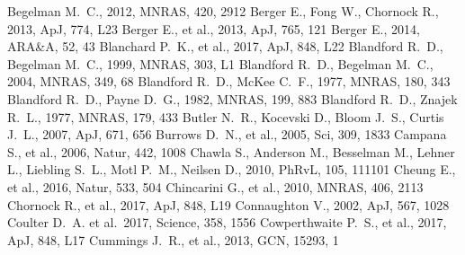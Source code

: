 \documentclass[a4paper,fleqn,usenatbib]{mnras}
\begin{document}
\begin{thebibliography}{207}
 Begelman M.~C., 2012, MNRAS, 420, 2912
 Berger E., Fong W., Chornock R., 2013, ApJ, 774, L23
 Berger E., et al., 2013, ApJ, 765, 121
 Berger E., 2014, ARA\&A, 52, 43
 Blanchard P.~K., et al., 2017, ApJ, 848, L22
 Blandford R.~D., Begelman M.~C., 1999, MNRAS, 303, L1
 Blandford R.~D., Begelman M.~C., 2004, MNRAS, 349, 68
 Blandford R.~D., McKee C.~F., 1977, MNRAS, 180, 343
 Blandford R.~D., Payne D.~G., 1982, MNRAS, 199, 883
 Blandford R.~D., Znajek R.~L., 1977, MNRAS, 179, 433
 Butler N.~R., Kocevski D., Bloom J.~S., Curtis J.~L., 2007, ApJ, 671, 656
 Burrows D.~N., et al., 2005, Sci, 309, 1833
 Campana S., et al., 2006, Natur, 442, 1008
 Chawla S., Anderson M., Besselman M., Lehner L., Liebling S.~L., Motl P.~M., Neilsen D., 2010, PhRvL, 105, 111101
 Cheung E., et al., 2016, Natur, 533, 504
 Chincarini G., et al., 2010, MNRAS, 406, 2113
 Chornock R., et al., 2017, ApJ, 848, L19
 Connaughton V., 2002, ApJ, 567, 1028
 Coulter D.~A. et al.\ 2017, Science, 358, 1556
 Cowperthwaite P.~S., et al., 2017, ApJ, 848, L17
 Cummings J.~R., et al., 2013, GCN, 15293, 1

\end{thebibliography}
\end{document}
